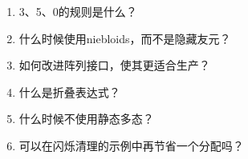 \begin{enumerate}
\item
3、5、0的规则是什么？

\item
什么时候使用niebloids，而不是隐藏友元？

\item
如何改进阵列接口，使其更适合生产？

\item
什么是折叠表达式？

\item
什么时候不使用静态多态？

\item
可以在闪烁清理的示例中再节省一个分配吗？
\end{enumerate}